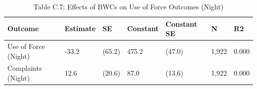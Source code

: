 \begin{table}

\caption{Table C.7: Effects of BWCs on Use of Force Outcomes (Night)}
\centering
\begin{tabular}[t]{lllllll}
\toprule
Outcome & Estimate & SE & Constant & Constant SE & N & R2\\
\midrule
Use of Force (Night) & -33.2 & (65.2) & 475.2 & (47.0) & 1,922 & 0.000\\
Complaints (Night) & 12.6 & (20.6) & 87.0 & (13.6) & 1,922 & 0.000\\
\bottomrule
\end{tabular}
\end{table}
